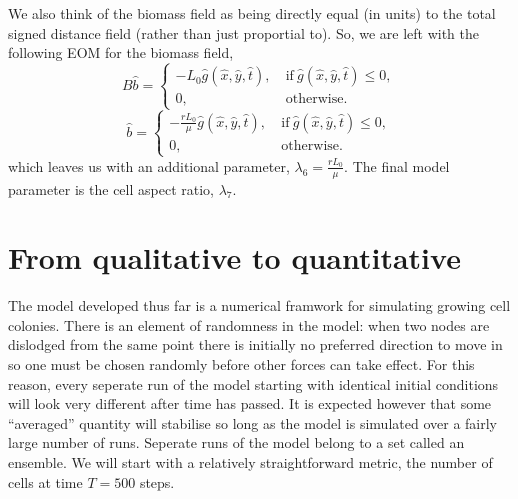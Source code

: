  We also think of the biomass
field as being directly equal (in units) to the total signed distance field (rather than just proportial to).
So, we are left with the following EOM for the biomass field,
\begin{equation*}
    B\hat{b} = \begin{cases}
                -  L_0\hat{g}(\hat{x},\hat{y},\hat{t}), & \ \textrm{if} \ \hat{g}(\hat{x},\hat{y},\hat{t}) \leq 0, \\
                    0, &    \ \textrm{otherwise}.
               \end{cases}
\end{equation*}
\begin{equation*}
    \hat{b} = \begin{cases}
                -  \frac{r L_0}{\mu}\hat{g}(\hat{x},\hat{y},\hat{t}), & \ \textrm{if} \ \hat{g}(\hat{x},\hat{y},\hat{t}) \leq 0, \\
                    0, &    \ \textrm{otherwise}.
               \end{cases}
\end{equation*}
which leaves us with an additional parameter, $\lambda_6 =\frac{r L_0}{\mu}$. The final model parameter is the cell aspect ratio, $\lambda_7$.


\section{From qualitative to quantitative}
The model developed thus far is a numerical framwork for simulating growing cell colonies.
There is an element of randomness in the model: when two nodes are dislodged from the 
same point there is initially no preferred direction to move in so one must be chosen randomly
before other forces can take effect. For this reason, every seperate run of the model 
starting with identical initial conditions will look very different after time has passed. 
It is expected however that some ``averaged''
quantity will stabilise so long as the model is simulated over a fairly large number of runs.
Seperate runs of the model belong to a set called an ensemble.
We will start with a relatively straightforward metric, the number of cells at time
$T = 500$ steps.

